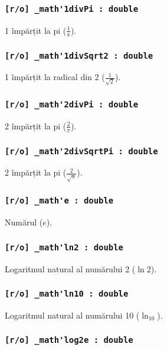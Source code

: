 \subsubsection{\lstinline|[r/o] _math'1divPi : double|}

1 împărțit la pi ($\frac{1}{\pi}$).

\subsubsection{\lstinline|[r/o] _math'1divSqrt2 : double|}

1 împărțit la radical din 2 ($\frac{1}{\sqrt{2}}$).

\subsubsection{\lstinline|[r/o] _math'2divPi : double|}

2 împărțit la pi ($\frac{2}{\pi}$).

\subsubsection{\lstinline|[r/o] _math'2divSqrtPi : double|}

2 împărțit la pi ($\frac{2}{\sqrt{\pi}}$).

\subsubsection{\lstinline|[r/o] _math'e : double|}

Numărul ($e$).

\subsubsection{\lstinline|[r/o] _math'ln2 : double|}

Logaritmul natural al numărului 2 ($\ln{2}$).

\subsubsection{\lstinline|[r/o] _math'ln10 : double|}

Logaritmul natural al numărului 10 ($\ln_{10}$).

\subsubsection{\lstinline|[r/o] _math'log2e : double|}


